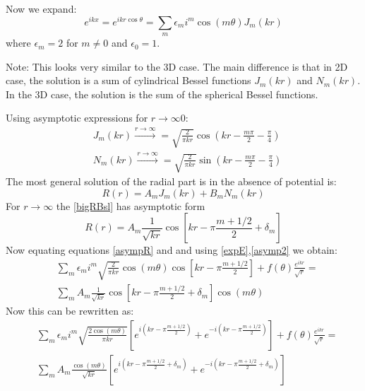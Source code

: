 Now we expand:
\begin{equation}\label{expE}
e^{ikx} = e^{ikr\cos\theta} = \sum_m{\epsilon_m i^m \cos(m\theta)J_m(kr)}
\end{equation}
where $\epsilon_m = 2 $ for $ m \neq 0 $ and $ \epsilon_0 = 1 $.

Note: This looks very similar to the 3D case. The main difference is that in 2D case, the solution is a sum of cylindrical Bessel functions $ J_m(kr) $ and $ N_m(kr) $.
In the 3D case, the solution is the sum of the spherical Bessel functions.

Using asymptotic expressions for $ r \rightarrow \infty 0$:
\begin{equation}\label{}
\begin{split}
& J_m(kr) \xrightarrow{r \rightarrow \infty}  = \sqrt{\frac{2}{\pi k r}}\cos\left(kr - \frac{m\pi}{2} - \frac{\pi}{4}\right) \\[.7em]
& N_m(kr) \xrightarrow{r \rightarrow \infty}  = \sqrt{\frac{2}{\pi k r}}\sin\left(kr - \frac{m\pi}{2} - \frac{\pi}{4}\right)
\end{split}
\end{equation}
The most general solution of the radial part is in the absence of potential is:
\begin{equation}\label{bigRBsl}
R(r) = A_mJ_m(kr) + B_mN_m(kr) 
\end{equation}
For $ r \rightarrow\infty $ the \eqref{bigRBsl} has asymptotic form
\begin{equation}\label{asympR}
R(r) = A_m\frac{1}{\sqrt{kr}}\cos\left[kr-\pi\frac{m + 1/2}{2} + \delta_m\right]
\end{equation}
Now equating equations \eqref{asympR} and and using \eqref{expE},\eqref{asymp2} we obtain:
\begin{equation}\label{asymR2}
\begin{split}
& \sum_m{\epsilon_m i^m\sqrt{\frac{2}{\pi kr}}\cos(m\theta)\cos\left[kr-\pi\frac{m + 1/2}{2}\right]} + f(\theta)\frac{e^{ikr}}{\sqrt{r}} = \\[.7em]
& \sum_m{A_m\frac{1}{\sqrt{kr}}\cos\left[kr-\pi\frac{m + 1/2}{2} + \delta_m\right]\cos(m\theta)}
\end{split}
\end{equation}
Now this can be rewritten as:
\begin{equation}\label{asyR3}
\begin{split}
& \sum_m{\epsilon_m i^m \sqrt{\frac{2\cos(m\theta)}{\pi kr}}\left[e^{i\left(kr-\pi\frac{m + 1/2}{2}\right)} + e^{-i\left(kr-\pi\frac{m + 1/2}{2}\right)}\right]}
+ f(\theta)\frac{e^{ikr}}{\sqrt{r}} = \\[.7em]
& \sum_m{A_m\frac{\cos(m\theta)}{\sqrt{kr}}\left[e^{i\left(kr-\pi\frac{m + 1/2}{2} + \delta_m\right)} + e^{-i\left(kr-\pi\frac{m + 1/2}{2} + \delta_m\right)}\right]}
\end{split}
\end{equation}
